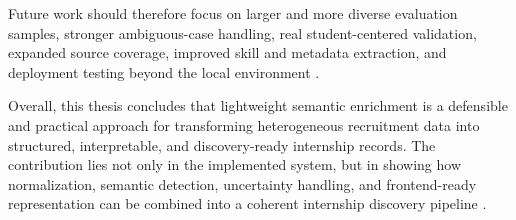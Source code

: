 Future work should therefore focus on larger and more diverse evaluation samples, stronger
ambiguous-case handling, real student-centered validation, expanded source coverage,
improved skill and metadata extraction, and deployment testing beyond the local
environment \cite{krippendorff2004content, batini2009methodologies}.

Overall, this thesis concludes that lightweight semantic enrichment is a defensible and
practical approach for transforming heterogeneous recruitment data into structured,
interpretable, and discovery-ready internship records. The contribution lies not only in the
implemented system, but in showing how normalization, semantic detection, uncertainty
handling, and frontend-ready representation can be combined into a coherent internship
discovery pipeline \cite{hevner2004design, doan2012principles, schwartz2020green}.
